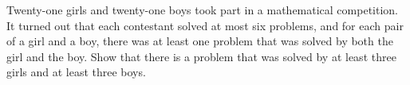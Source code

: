 Twenty-one girls and twenty-one boys took part in a mathematical competition. It turned out that each contestant solved at most six problems, and for each pair of a girl and a boy, there was at least one problem that was solved by both the girl and the boy. Show that there is a problem that was solved by at least three girls and at least three boys.
